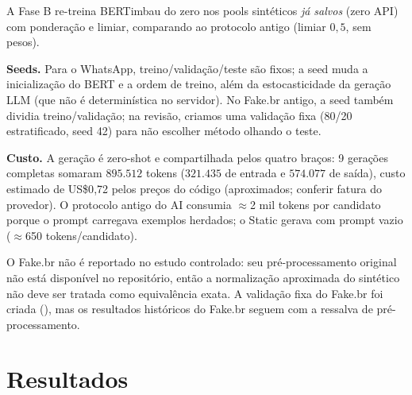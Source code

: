 \documentclass[conference]{IEEEtran}
\begin{document}
A Fase B re-treina BERTimbau do zero nos pools sintéticos \emph{já salvos} (zero API) com ponderação e limiar, comparando ao protocolo antigo (limiar $0{,}5$, sem pesos).

\textbf{Seeds.} Para o WhatsApp, treino/validação/teste são fixos; a seed muda a inicialização do BERT e a ordem de treino, além da estocasticidade da geração LLM (que não é determinística no servidor). No Fake.br antigo, a seed também dividia treino/validação; na revisão, criamos uma validação fixa (80/20 estratificado, seed 42) para não escolher método olhando o teste.

\textbf{Custo.} A geração é zero-shot e compartilhada pelos quatro braços: 9 gerações completas somaram $895.512$ tokens ($321.435$ de entrada e $574.077$ de saída), custo estimado de US\$0{,}72 pelos preços do código (aproximados; conferir fatura do provedor). O protocolo antigo do AI consumia $\approx$2 mil tokens por candidato porque o prompt carregava exemplos herdados; o Static gerava com prompt vazio ($\approx$650 tokens/candidato).

O Fake.br não é reportado no estudo controlado: seu pré-processamento original não está disponível no repositório, então a normalização aproximada do sintético não deve ser tratada como equivalência exata. A validação fixa do Fake.br foi criada (), mas os resultados históricos do Fake.br seguem com a ressalva de pré-processamento.

\section{Resultados}
\end{document}

